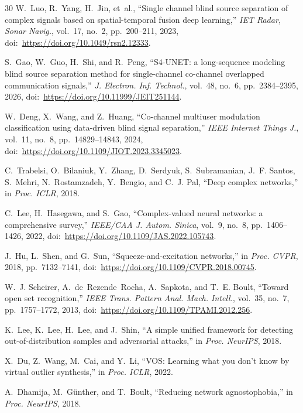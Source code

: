 \documentclass[review,12pt]{elsarticle}
\begin{document}
\begin{thebibliography}{30}
W.~Luo, R.~Yang, H.~Jin, et~al.,
``Single channel blind source separation of complex signals based on
spatial-temporal fusion deep learning,''
\emph{IET Radar, Sonar Navig.}, vol.~17, no.~2, pp.~200--211, 2023,
doi:~\url{https://doi.org/10.1049/rsn2.12333}.

S.~Gao, W.~Guo, H.~Shi, and R.~Peng,
``S4-UNET: a long-sequence modeling blind source separation method for
single-channel co-channel overlapped communication signals,''
\emph{J. Electron. Inf. Technol.}, vol.~48, no.~6, pp.~2384--2395,
2026, doi:~\url{https://doi.org/10.11999/JEIT251144}.

W.~Deng, X.~Wang, and Z.~Huang,
``Co-channel multiuser modulation classification using data-driven blind
signal separation,''
\emph{IEEE Internet Things J.}, vol.~11, no.~8, pp.~14829--14843, 2024,
doi:~\url{https://doi.org/10.1109/JIOT.2023.3345023}.

C.~Trabelsi, O.~Bilaniuk, Y.~Zhang, D.~Serdyuk, S.~Subramanian,
J.~F. Santos, S.~Mehri, N.~Rostamzadeh, Y.~Bengio, and C.~J. Pal,
``Deep complex networks,''
in \emph{Proc. ICLR}, 2018.

C.~Lee, H.~Hasegawa, and S.~Gao,
``Complex-valued neural networks: a comprehensive survey,''
\emph{IEEE/CAA J. Autom. Sinica}, vol.~9, no.~8, pp.~1406--1426, 2022,
doi:~\url{https://doi.org/10.1109/JAS.2022.105743}.

J.~Hu, L.~Shen, and G.~Sun,
``Squeeze-and-excitation networks,''
in \emph{Proc. CVPR}, 2018, pp.~7132--7141,
doi:~\url{https://doi.org/10.1109/CVPR.2018.00745}.

W.~J. Scheirer, A.~de~Rezende~Rocha, A.~Sapkota, and T.~E. Boult,
``Toward open set recognition,''
\emph{IEEE Trans. Pattern Anal. Mach. Intell.}, vol.~35, no.~7,
pp.~1757--1772, 2013, doi:~\url{https://doi.org/10.1109/TPAMI.2012.256}.

K.~Lee, K.~Lee, H.~Lee, and J.~Shin,
``A simple unified framework for detecting out-of-distribution samples
and adversarial attacks,''
in \emph{Proc. NeurIPS}, 2018.

X.~Du, Z.~Wang, M.~Cai, and Y.~Li,
``VOS: Learning what you don't know by virtual outlier synthesis,''
in \emph{Proc. ICLR}, 2022.

A.~Dhamija, M.~G{\"u}nther, and T.~Boult,
``Reducing network agnostophobia,''
in \emph{Proc. NeurIPS}, 2018.


\end{thebibliography}
\end{document}
